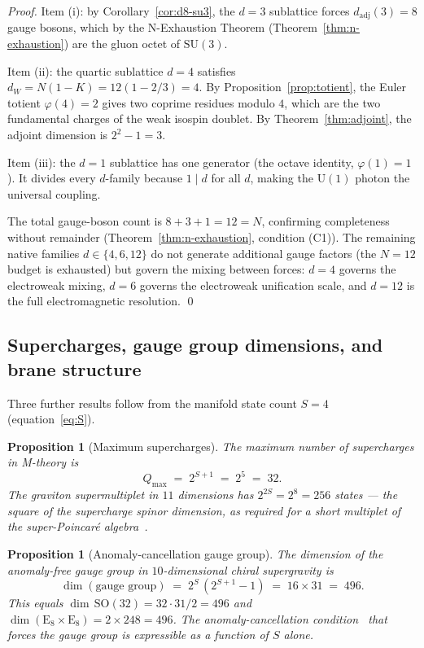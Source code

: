 \documentclass[11pt,a4paper]{article}
\newtheorem{proposition}[theorem]{Proposition}
\theoremstyle{definition}
\theoremstyle{remark}
\begin{document}
\begin{proof}
Item (i): by Corollary~\ref{cor:d8-su3}, the $d=3$ sublattice forces $d_{\mathrm{adj}}(3) = 8$ gauge bosons, which by the N-Exhaustion Theorem (Theorem~\ref{thm:n-exhaustion}) are the gluon octet of $\mathrm{SU}(3)$.

Item (ii): the quartic sublattice $d = 4$ satisfies $d_{W} = N(1-K) = 12(1 - 2/3) = 4$. By Proposition~\ref{prop:totient}, the Euler totient $\varphi(4) = 2$ gives two coprime residues modulo $4$, which are the two fundamental charges of the weak isospin doublet. By Theorem~\ref{thm:adjoint}, the adjoint dimension is $2^{2} - 1 = 3$.

Item (iii): the $d=1$ sublattice has one generator (the octave identity, $\varphi(1) = 1$). It divides every $d$-family because $1 \mid d$ for all $d$, making the $\mathrm{U}(1)$ photon the universal coupling.

The total gauge-boson count is $8 + 3 + 1 = 12 = N$, confirming completeness without remainder (Theorem~\ref{thm:n-exhaustion}, condition (C1)). The remaining native families $d \in \{4,6,12\}$ do not generate additional gauge factors (the $N = 12$ budget is exhausted) but govern the mixing between forces: $d = 4$ governs the electroweak mixing, $d = 6$ governs the electroweak unification scale, and $d = 12$ is the full electromagnetic resolution. \qed
\end{proof}

\subsection{Supercharges, gauge group dimensions, and brane structure}\label{subsec:supercharges}

Three further results follow from the manifold state count $S = 4$ (equation~\eqref{eq:S}).

\begin{proposition}[Maximum supercharges]\label{prop:supercharges}
The maximum number of supercharges in M-theory is
\[
Q_{\max} \;=\; 2^{S+1} \;=\; 2^{5} \;=\; 32.
\]
The graviton supermultiplet in $11$ dimensions has $2^{2S} = 2^{8} = 256$ states --- the square of the supercharge spinor dimension, as required for a short multiplet of the super-Poincar\'e algebra~\cite{Nahm1978}.
\end{proposition}

\begin{proposition}[Anomaly-cancellation gauge group]\label{prop:anomaly-gauge}
The dimension of the anomaly-free gauge group in $10$-dimensional chiral supergravity is
\[
\dim(\text{gauge group}) \;=\; 2^{S}\,(2^{S+1}-1) \;=\; 16 \times 31 \;=\; 496.
\]
This equals $\dim\,\mathrm{SO}(32) = 32 \cdot 31/2 = 496$ and $\dim(\mathrm{E}_{8} \times \mathrm{E}_{8}) = 2 \times 248 = 496$. The anomaly-cancellation condition~\cite{GreenSchwarz1984} that forces the gauge group is expressible as a function of $S$ alone.
\end{proposition}
\end{document}
